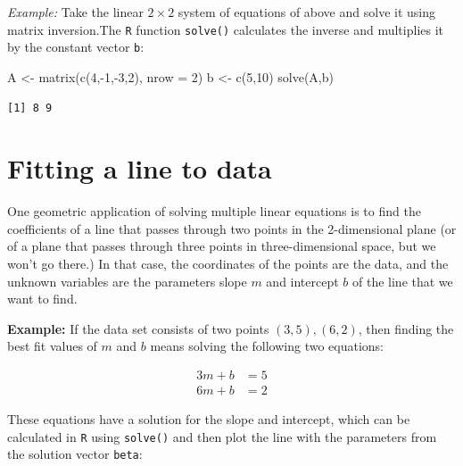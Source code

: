 \documentclass[
  letterpaper,
  DIV=11,
  numbers=noendperiod]{scrreprt}
\newenvironment{Shaded}{\begin{snugshade}}{\end{snugshade}}
\newcommand{\AttributeTok}[1]{\textcolor[rgb]{0.40,0.45,0.13}{#1}}
\newcommand{\DecValTok}[1]{\textcolor[rgb]{0.68,0.00,0.00}{#1}}
\newcommand{\FunctionTok}[1]{\textcolor[rgb]{0.28,0.35,0.67}{#1}}
\newcommand{\NormalTok}[1]{\textcolor[rgb]{0.00,0.23,0.31}{#1}}
\newcommand{\OtherTok}[1]{\textcolor[rgb]{0.00,0.23,0.31}{#1}}
\newcommand{\SpecialCharTok}[1]{\textcolor[rgb]{0.37,0.37,0.37}{#1}}
\begin{document}
\emph{Example:} Take the linear \(2 \times 2\) system of equations of
above and solve it using matrix inversion.The \texttt{R} function
\texttt{solve()} calculates the inverse and multiplies it by the
constant vector \texttt{b}:

\begin{Shaded}
\begin{Highlighting}[]
\NormalTok{A }\OtherTok{\textless{}{-}} \FunctionTok{matrix}\NormalTok{(}\FunctionTok{c}\NormalTok{(}\DecValTok{4}\NormalTok{,}\SpecialCharTok{{-}}\DecValTok{1}\NormalTok{,}\SpecialCharTok{{-}}\DecValTok{3}\NormalTok{,}\DecValTok{2}\NormalTok{), }\AttributeTok{nrow =} \DecValTok{2}\NormalTok{)}
\NormalTok{b }\OtherTok{\textless{}{-}} \FunctionTok{c}\NormalTok{(}\DecValTok{5}\NormalTok{,}\DecValTok{10}\NormalTok{)}
\FunctionTok{solve}\NormalTok{(A,b)}
\end{Highlighting}
\end{Shaded}

\begin{verbatim}
[1] 8 9
\end{verbatim}

\hypertarget{fitting-a-line-to-data}{%
\section{Fitting a line to data}\label{fitting-a-line-to-data}}

One geometric application of solving multiple linear equations is to
find the coefficients of a line that passes through two points in the
2-dimensional plane (or of a plane that passes through three points in
three-dimensional space, but we won't go there.) In that case, the
coordinates of the points are the data, and the unknown variables are
the parameters slope \(m\) and intercept \(b\) of the line that we want
to find.

\textbf{Example:} If the data set consists of two points
\((3,5), (6, 2)\), then finding the best fit values of \(m\) and \(b\)
means solving the following two equations:

\[
\begin{aligned}
 3m + b &= 5 \\
 6m + b &= 2
\end{aligned}
\]

These equations have a solution for the slope and intercept, which can
be calculated in \texttt{R} using \texttt{solve()} and then plot the
line with the parameters from the solution vector \texttt{beta}:
\end{document}
